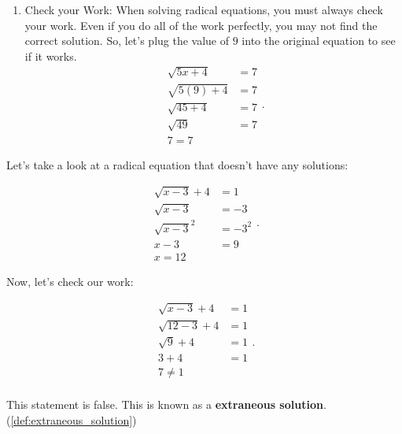 \begin{enumerate}
  \item Check your Work: When solving radical equations, you must always check
    your work. Even if you do all of the work perfectly, you may not find the
    correct solution. So, let's plug the value of $9$ into the original equation
    to see if it works.
      \begin{equation}
        \label{eqt:solving_radical_equations_check_your_work_3}
        \begin{split}
          \sqrt{5x + 4} &= 7 \\
          \sqrt{5(9) + 4} &= 7 \\
          \sqrt{45 + 4} &= 7 \\
          \sqrt{49} &= 7 \\
          \boxed{7 = 7}
        \end{split}
      .\end{equation}
\end{enumerate}

Let's take a look at a radical equation that doesn't have any solutions:

\begin{example}
  \label{exm:solving_radical_equations_no_solutions}

  \begin{equation}
    \label{eqt:solving_radical_equations_no_solutions_1}
    \begin{split}
      \sqrt{x - 3} + 4 &= 1 \\
      \sqrt{x - 3} &= -3 \\
      \sqrt{x - 3}^{2} &= -3^{2} \\
      x - 3 &= 9 \\
      \boxed{x = 12}
    \end{split}
  .\end{equation}

  Now, let's check our work:

  \begin{equation}
    \label{eqt:solving_radical_equations_no_solutions_2}
    \begin{split}
      \sqrt{x - 3} + 4 &= 1 \\
      \sqrt{12 - 3} + 4 &= 1 \\
      \sqrt{9} + 4 &= 1 \\
      3 + 4 &= 1 \\
      7 \ne 1 \\
    \end{split}
  .\end{equation}

  This statement is false. This is known as a \textbf{extraneous solution}.
  (\ref{def:extraneous_solution})
\end{example}

